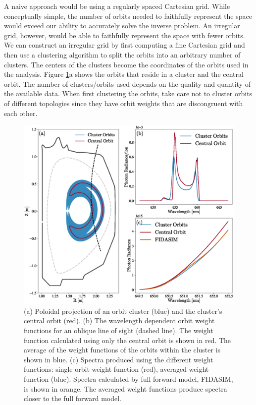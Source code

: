 A naive approach would be using a regularly spaced Cartesian grid. While conceptually simple, the number of orbits needed to faithfully represent the space would exceed our ability to accurately solve the inverse problem. An irregular grid, however, would be able to faithfully represent the space with fewer orbits.
We can construct an irregular grid by first computing a fine Cartesian grid and then use a clustering algorithm to split the orbits into an arbitrary number of clusters. The centers of the clusters become the coordinates of the orbits used in the analysis. Figure \ref{fig:orbit_cluster}a shows the orbits that reside in a cluster and the central orbit. The number of clusters/orbits used depends on the quality and quantity of the available data. When first clustering the orbits, take care not to cluster orbits of different topologies since they have orbit weights that are discongruent with each other.
\begin{figure}[h!]
    \centering
    \includegraphics[width=15cm]{figures/orbit_cluster.eps}
    \caption{(a) Poloidal projection of an orbit cluster (blue) and the cluster's central orbit (red). (b) The wavelength dependent orbit weight functions for an oblique line of sight (dashed line). The weight function calculated using only the central orbit is shown in red. The average of the weight functions of the orbits within the cluster is shown in blue. (c) Spectra produced using the different weight functions: single orbit weight function (red), averaged weight function (blue). Spectra calculated by full forward model, FIDASIM, is shown in orange. The averaged weight functions produce spectra closer to the full forward model.}
    \label{fig:orbit_cluster}
\end{figure}

